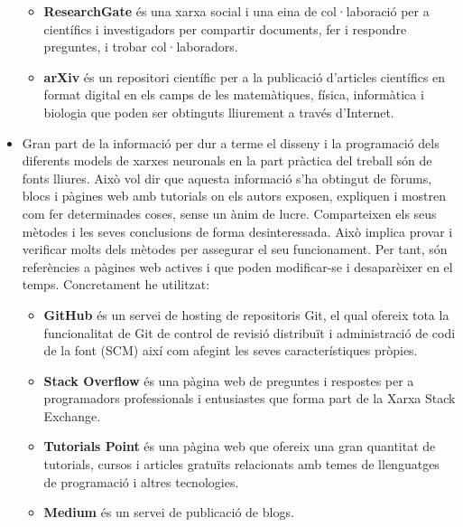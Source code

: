 \begin{refsection}
\begin{itemize}
\begin{itemize}
			      \item \textbf{ResearchGate} és una xarxa social i una eina de col·laboració per a científics i investigadors per compartir documents, fer i respondre preguntes, i trobar col·laboradors.\supercite{ResearchGate}

			      \item \textbf{arXiv} és un repositori científic per a la publicació d'articles científics en format digital en els camps de les matemàtiques, física, informàtica i biologia que poden ser obtinguts lliurement a través d'Internet.\supercite{ArXiv}

		      \end{itemize}

		\item Gran part de la informació per dur a terme el disseny i la programació dels diferents models de xarxes neuronals en la part pràctica del treball són de fonts lliures. Això vol dir que aquesta informació s'ha obtingut de fòrums, blocs i pàgines web amb tutorials on els autors exposen, expliquen i mostren com fer determinades coses, sense un ànim de lucre. Comparteixen els seus mètodes i les seves conclusions de forma desinteressada. Això implica provar i verificar molts dels mètodes per assegurar el seu funcionament. Per tant, són referències a pàgines web actives i que poden modificar-se i desaparèixer en el temps. Concretament he utilitzat:

		      \begin{itemize}

			      \item \textbf{GitHub} és un servei de hosting de repositoris Git, el qual ofereix tota la funcionalitat de Git de control de revisió distribuït i administració de codi de la font (SCM) així com afegint les seves característiques pròpies.\supercite{GitHub}

			      \item \textbf{Stack Overflow} és una pàgina web de preguntes i respostes per a programadors professionals i entusiastes que forma part de la Xarxa Stack Exchange.\supercite{StackOverflow}

			      \item \textbf{Tutorials Point} és una pàgina web que ofereix una gran quantitat de tutorials, cursos i articles gratuïts relacionats amb temes de llenguatges de programació i altres tecnologies.\supercite{TutorialsPoint}

			      \item \textbf{Medium} és un servei de publicació de blogs.\supercite{Medium}

		      \end{itemize}

	\end{itemize}

	\printbibliography[heading=subbibintoc]

\end{refsection}